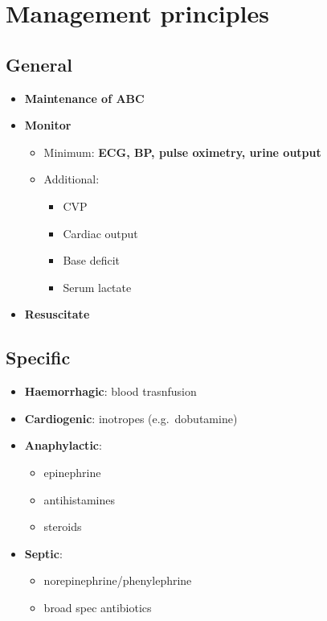 \documentclass[
  12pt,
]{memoir}
\providecommand{\tightlist}{%
  \setlength{\itemsep}{0pt}\setlength{\parskip}{0pt}}
\begin{document}
\hypertarget{management-principles}{%
\section{Management principles}\label{management-principles}}

\hypertarget{general}{%
\subsection{General}\label{general}}

\begin{itemize}
\tightlist
\item
  \textbf{Maintenance of ABC}
\item
  \textbf{Monitor}

  \begin{itemize}
  \tightlist
  \item
    Minimum: \textbf{ECG, BP, pulse oximetry, urine output}
  \item
    Additional:

    \begin{itemize}
    \tightlist
    \item
      CVP
    \item
      Cardiac output
    \item
      Base deficit
    \item
      Serum lactate
    \end{itemize}
  \end{itemize}
\item
  \textbf{Resuscitate}
\end{itemize}

\hypertarget{specific}{%
\subsection{Specific}\label{specific}}

\begin{itemize}
\tightlist
\item
  \textbf{Haemorrhagic}: blood trasnfusion
\item
  \textbf{Cardiogenic}: inotropes (e.g.~dobutamine)
\item
  \textbf{Anaphylactic}:

  \begin{itemize}
  \tightlist
  \item
    epinephrine
  \item
    antihistamines
  \item
    steroids
  \end{itemize}
\item
  \textbf{Septic}:

  \begin{itemize}
  \tightlist
  \item
    norepinephrine/phenylephrine
  \item
    broad spec antibiotics
  \end{itemize}
\end{itemize}
\end{document}
